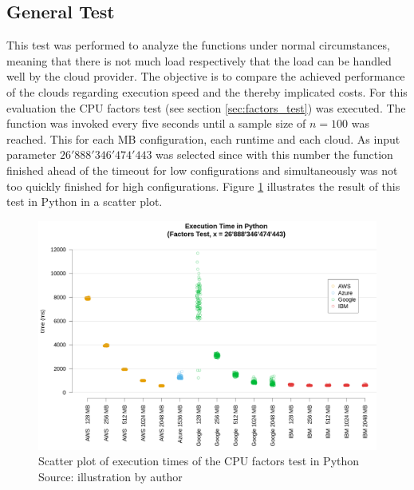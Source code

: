 \subsection{General Test}
\label{sec:general_test}
This test was performed to analyze the functions under normal circumstances, meaning that there is not much load respectively that the load can be handled well by the cloud provider. The objective is to compare the achieved performance of the clouds regarding execution speed and the thereby implicated costs. For this evaluation the \gls{CPU} factors test (see section \ref{sec:factors_test}) was executed. The function was invoked every five seconds until a sample size of $n=100$ was reached. This for each \gls{MB} configuration, each runtime and each cloud. As input parameter $26'888'346'474'443$ was selected since with this number the function finished ahead of the timeout for low configurations and simultaneously was not too quickly finished for high configurations. Figure \ref{fig:general_python_plot} illustrates the result of this test in Python in a scatter plot.
\begin{figure}[htp]
\begin{center}
\includegraphics[scale=0.4]{bilder/scatterplot_general_python.png}
\captionsetup{justification=centering, labelfont=bf}
\caption[Scatter plot of execution times of the \gls{CPU} factors test in Python]{Scatter plot of execution times of the \gls{CPU} factors test in Python\\ Source: illustration by author}
\label{fig:general_python_plot}
\end{center}
\end{figure}

